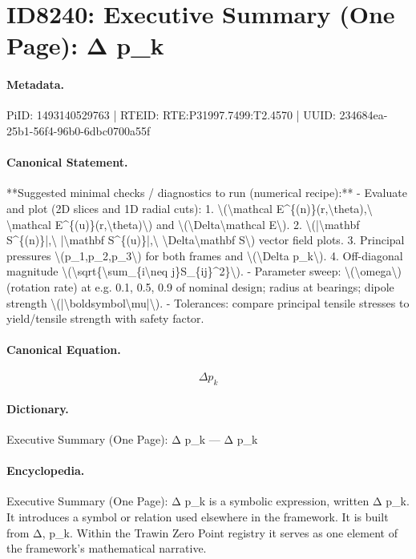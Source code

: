 \section*{ID8240: Executive Summary (One Page): Δ p\_k}
\paragraph{Metadata.}
PiID: 1493140529763 | RTEID: RTE:P31997.7499:T2.4570 | UUID: 234684ea-25b1-56f4-96b0-6dbc0700a55f

\paragraph{Canonical Statement.}
**Suggested minimal checks / diagnostics to run (numerical recipe):** - Evaluate and plot (2D slices and 1D radial cuts): 1. \textbackslash{}(\textbackslash{}mathcal E\textasciicircum{}\{(n)\}(r,\textbackslash{}theta),\textbackslash{} \textbackslash{}mathcal E\textasciicircum{}\{(u)\}(r,\textbackslash{}theta)\textbackslash{}) and \textbackslash{}(\textbackslash{}Delta\textbackslash{}mathcal E\textbackslash{}). 2. \textbackslash{}(|\textbackslash{}mathbf S\textasciicircum{}\{(n)\}|,\textbackslash{} |\textbackslash{}mathbf S\textasciicircum{}\{(u)\}|,\textbackslash{} \textbackslash{}Delta\textbackslash{}mathbf S\textbackslash{}) vector field plots. 3. Principal pressures \textbackslash{}(p\_1,p\_2,p\_3\textbackslash{}) for both frames and \textbackslash{}(\textbackslash{}Delta p\_k\textbackslash{}). 4. Off-diagonal magnitude \textbackslash{}(\textbackslash{}sqrt\{\textbackslash{}sum\_\{i\textbackslash{}neq j\}S\_\{ij\}\textasciicircum{}2\}\textbackslash{}). - Parameter sweep: \textbackslash{}(\textbackslash{}omega\textbackslash{}) (rotation rate) at e.g. 0.1, 0.5, 0.9 of nominal design; radius at bearings; dipole strength \textbackslash{}(|\textbackslash{}boldsymbol\textbackslash{}mu|\textbackslash{}). - Tolerances: compare principal tensile stresses to yield/tensile strength with safety factor.

\paragraph{Canonical Equation.}
\[
\Delta p_k
\]

\paragraph{Dictionary.}
Executive Summary (One Page): Δ p\_k — Δ p\_k

\paragraph{Encyclopedia.}
Executive Summary (One Page): Δ p\_k is a symbolic expression, written Δ p\_k. It introduces a symbol or relation used elsewhere in the framework. It is built from Δ, p\_k. Within the Trawin Zero Point registry it serves as one element of the framework's mathematical narrative.
